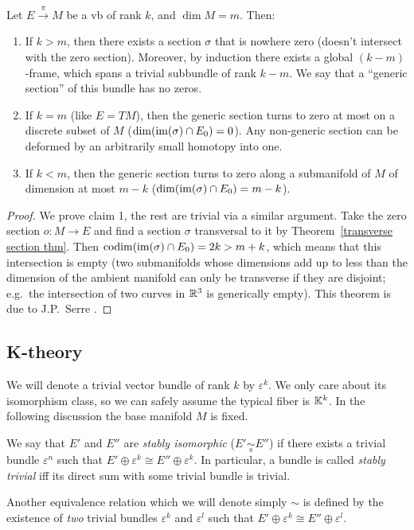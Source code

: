 \begin{cor}
Let $E\overset{\pi}{\to} M$ be a \gls{vb} of rank $k$, and $\dim M=m$. Then:
\begin{enumerate}
    \item If $k>m$, then there exists a section $\sigma$ that is nowhere zero (doesn't intersect with the zero section). Moreover, by induction there exists a global $(k-m)$-frame, which spans a trivial subbundle of rank $k-m$. We say that a ``generic section'' of this bundle has no zeros.
    \item If $k=m$ (like $E=TM$), then the generic section turns to zero at most on a discrete subset of $M$ ($\dim(\operatorname{im}(\sigma)\cap E_0)=0$). Any non-generic section can be deformed by an arbitrarily small homotopy into one.
    \item If $k<m$, then the generic section turns to zero along a submanifold of $M$ of dimension at most $m-k$ ($\dim(\operatorname{im}(\sigma)\cap E_0)=m-k$). 
\end{enumerate}
\end{cor}
\begin{proof}
    We prove claim 1, the rest are trivial via a similar argument. Take the zero section $o:M\to E$ and find a   section $\sigma$ transversal to it by Theorem~\ref{transverse section thm}. Then $\operatorname{codim}(\operatorname{im} (\sigma)\cap E_0)=2k>m+k$, which means that this intersection is empty (two submanifolds whose dimensions add up to less than the dimension of the ambient manifold can only be transverse if they are disjoint; e.g.\ the intersection of two curves in $\mathbb{R}^3$ is generically empty). This theorem is due to J.P.~Serre \cite[Thm.~2]{Atiyah}.
\end{proof}






\subsection{K-theory}

We will denote a trivial vector bundle of rank $k$ by $\varepsilon^k$. We only care about its isomorphism class, so we can safely assume the typical fiber is $\mathbb{K}^k$. In the following discussion the base manifold $M$ is fixed.

\begin{defn}
We say that $E'$ and $E''$ are \emph{stably isomorphic} ($E'\underset{\mathrm{s}}{\sim}E''$) if there exists a trivial bundle $\varepsilon^n$ such that $E'\oplus \varepsilon^k \cong E''\oplus\varepsilon^k$. In particular, a bundle is called \emph{stably trivial} iff its direct sum with some trivial bundle is trivial.

Another equivalence relation which we will denote simply $\sim$ is defined by the existence of \emph{two} trivial bundles $\varepsilon^k$ and $\varepsilon^l$ such that $E'\oplus \varepsilon^k\cong E''\oplus \varepsilon^l$.
\end{defn}

